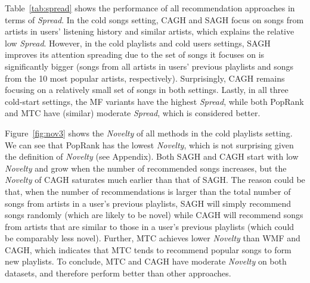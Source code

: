 Table~\ref{tab:spread} shows the performance of all recommendation approaches in terms of \emph{Spread}.
In the cold songs setting, CAGH and SAGH focus on songs from artists in users' listening history and similar artists, 
which explains the relative low \emph{Spread}.
However, in the cold playlists and cold users settings, 
SAGH improves its attention spreading due to the set of songs it focuses on is significantly bigger 
(\ie songs from all artists in users' previous playlists and songs from the 10 most popular artists, respectively).
Surprisingly, CAGH remains focusing on a relatively small set of songs in both settings.
Lastly, in all three cold-start settings, the MF variants have the highest \emph{Spread},
while both PopRank and MTC have (similar) moderate \emph{Spread},
which is considered better. %




Figure~\ref{fig:nov3} shows the \emph{Novelty} of all methods in the cold playlists setting.
We can see that PopRank has the lowest \emph{Novelty},
which is not surprising given the definition of \emph{Novelty} (see Appendix).
Both SAGH and CAGH start with low \emph{Novelty} and grow when the number of recommended songs increases,
but the \emph{Novelty} of CAGH saturates much earlier than that of SAGH.
The reason could be that,
when the number of recommendations is larger than the total number of songs from artists in a user's previous playlists,
SAGH will simply recommend songs randomly (which are likely to be novel)
while CAGH will recommend songs from artists that are similar to those in a user's previous playlists
(which could be comparably less novel).
Further, MTC achieves lower \emph{Novelty} than WMF and CAGH, 
which indicates that MTC tends to recommend popular songs to form new playlists. %
To conclude, 
MTC and CAGH have moderate \emph{Novelty} on both datasets,
and therefore perform better than other approaches.

